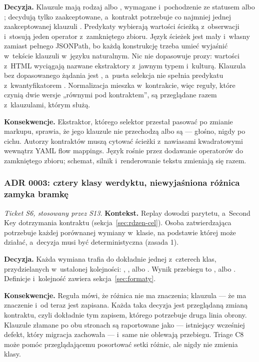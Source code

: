 \textbf{Decyzja.} Klauzule mają rodzaj  albo , wymagane
 i~pochodzenie ze statusem  albo ;
decydują tylko zaakceptowane, a~kontrakt potrzebuje co najmniej jednej zaakceptowanej
klauzuli . Predykaty wybierają wartości ścieżką z~obserwacji i~stosują jeden
operator z~zamkniętego zbioru. Język ścieżek jest mały i~własny zamiast pełnego JSONPath,
bo każdą konstrukcję trzeba umieć wyjaśnić w~tekście klauzuli w~języku naturalnym. Nic nie
dopasowuje prozy: wartości z~HTML wyciągają nazwane ekstraktory z~jawnym typem i~kulturą.
Klauzula bez dopasowanego żądania jest , a~pusta selekcja nie spełnia
predykatu z~kwantyfikatorem . Normalizacja mieszka w~kontrakcie, więc reguły,
które czynią dwie wersje „równymi pod kontraktem”, są przeglądane razem z~klauzulami, którym
służą.

\textbf{Konsekwencje.} Ekstraktor, którego selektor przestał pasować po zmianie markupu,
sprawia, że jego klauzule nie przechodzą albo są  --- głośno, nigdy po
cichu. Autorzy kontraktów muszą cytować ścieżki z~nawiasami kwadratowymi wewnątrz YAML flow
mappings. Język rośnie przez dodawanie operatorów do zamkniętego zbioru; schemat, silnik i~renderowanie tekstu zmieniają się razem.

\subsubsection{ADR 0003: cztery klasy werdyktu, niewyjaśniona różnica zamyka bramkę}

\emph{Ticket S6, stosowany przez S13.} \textbf{Kontekst.} Replay dowodzi parytetu, a~Second
Key dotrzymania kontraktu (sekcja~\ref{sec:rdzen-cel}). Osoba zatwierdzająca potrzebuje
każdej porównanej wymiany w~klasie, na podstawie której może działać, a~decyzja musi być
deterministyczna (zasada 1).

\textbf{Decyzja.} Każda wymiana trafia do dokładnie jednej z~czterech klas, przydzielanych
w~ustalonej kolejności: , ,
 albo . Wynik przebiegu to ,
 albo . Definicje i~kolejność zawiera
sekcja~\ref{sec:formaty}.

\textbf{Konsekwencje.}  Reguła mówi, że różnica nie ma znaczenia;
klauzula --- że ma znaczenie i~od teraz jest zapisana. Każda taka decyzja jest przeglądaną
zmianą kontraktu, czyli dokładnie tym zapisem, którego potrzebuje druga linia obrony.
Klauzule złamane po obu stronach są raportowane jako  ---
istniejący wcześniej defekt, który migracja zachowała --- i~same nie oblewają przebiegu.
Triage C8 może pomóc przeglądającemu posortować setki różnic, ale nigdy nie zmienia klasy.

